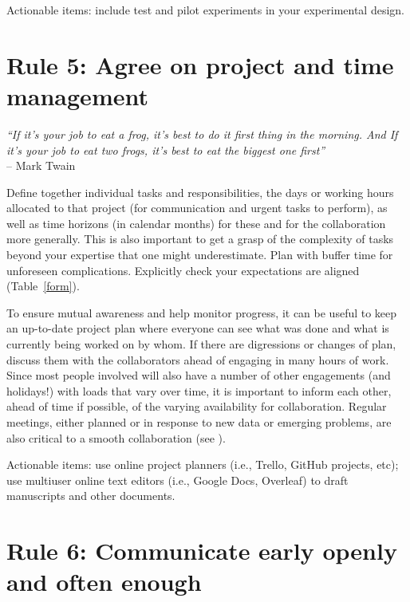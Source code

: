 \documentclass{article}
\begin{document}
Actionable items: include test and pilot experiments in your experimental design.

\section*{Rule 5: Agree on project and time management} %
\label{rule5_time}

\begin{flushright}
\rightskip=1cm\textit{``If it's your job to eat a frog, it's best to do it first thing in the morning. And If it's your job to eat two frogs, it's best to eat the biggest one first''} \\
\vspace{.2em}
\rightskip=0cm -- Mark Twain
\end{flushright}

Define together individual tasks and responsibilities, the days or working hours allocated to that project (for communication and urgent tasks to perform), as well as time horizons (in calendar months) for these and for the collaboration more generally. This is also important to get a grasp of the complexity of tasks beyond your expertise that one might underestimate. Plan with buffer time for unforeseen complications. Explicitly check your expectations are aligned (Table~\ref{form}).

To ensure mutual awareness and help monitor progress, it can be useful to keep an up-to-date project plan where everyone can see what was done and what is currently being worked on by whom. If there are digressions or changes of plan, discuss them with the collaborators ahead of engaging in many hours of work. Since most people involved will also have a number of other engagements (and holidays!) with loads that vary over time, it is important to inform each other, ahead of time if possible, of the varying availability for collaboration. Regular meetings, either planned or in response to new data or emerging problems, are also critical to a smooth collaboration (see ). 

Actionable items: use online project planners (i.e., Trello, GitHub projects, etc); use multiuser online text editors (i.e., Google Docs, Overleaf) to draft manuscripts and other documents.

\section*{Rule 6: Communicate early openly and often enough} %
\label{rule6_communication}
\end{document}
